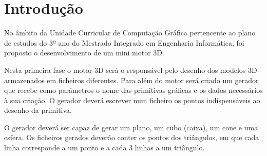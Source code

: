 \chapter{Introdução}
\label{cap:intro}

No âmbito da Unidade Curricular de Computação Gráfica pertencente ao plano de estudos do 3º ano do Mestrado Integrado em Engenharia Informática, foi proposto o desenvolvimento de um mini motor 3D. 


 Nesta primeira fase o motor 3D será o responsável pelo desenho dos modelos 3D armazenados em ficheiros diferentes. Para além do motor será criado um gerador que recebe como parâmetros o nome das primitivas gráficas e os dados necessários à sua criação. O gerador deverá escrever num ficheiro os pontos indispensáveis ao desenho da primitiva.
 
 O gerador deverá ser capaz de gerar um plano, um cubo (caixa), um cone e uma esfera. Os ficheiros gerados deverão conter os pontos dos triângulos, em que cada linha corresponde a um ponto e a cada 3 linhas a um triângulo.
